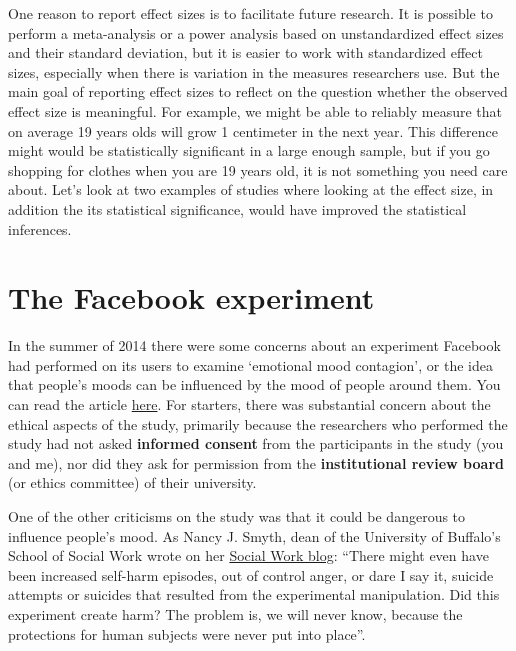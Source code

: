 \documentclass[
  oneside]{book}
\begin{document}
One reason to report effect sizes is to facilitate future research. It is possible to perform a meta-analysis or a power analysis based on unstandardized effect sizes and their standard deviation, but it is easier to work with standardized effect sizes, especially when there is variation in the measures researchers use. But the main goal of reporting effect sizes to reflect on the question whether the observed effect size is meaningful. For example, we might be able to reliably measure that on average 19 years olds will grow 1 centimeter in the next year. This difference might would be statistically significant in a large enough sample, but if you go shopping for clothes when you are 19 years old, it is not something you need care about. Let's look at two examples of studies where looking at the effect size, in addition the its statistical significance, would have improved the statistical inferences.

\hypertarget{the-facebook-experiment}{%
\section{The Facebook experiment}\label{the-facebook-experiment}}

In the summer of 2014 there were some concerns about an experiment Facebook had performed on its users to examine `emotional mood contagion', or the idea that people's moods can be influenced by the mood of people around them. You can read the article \href{http://www.pnas.org/content/111/24/8788.full}{here}. For starters, there was substantial concern about the ethical aspects of the study, primarily because the researchers who performed the study had not asked \textbf{informed consent} from the participants in the study (you and me), nor did they ask for permission from the \textbf{institutional review board} (or ethics committee) of their university.

One of the other criticisms on the study was that it could be dangerous to influence people's mood. As Nancy J. Smyth, dean of the University of Buffalo's School of Social Work wrote on her \href{https://njsmyth.wordpress.com/2014/06/29/did-facebooks-secret-mood-manipulation-experiment-create-harm/}{Social Work blog}: ``There might even have been increased self-harm episodes, out of control anger, or dare I say it, suicide attempts or suicides that resulted from the experimental manipulation. Did this experiment create harm? The problem is, we will never know, because the protections for human subjects were never put into place''.
\end{document}

